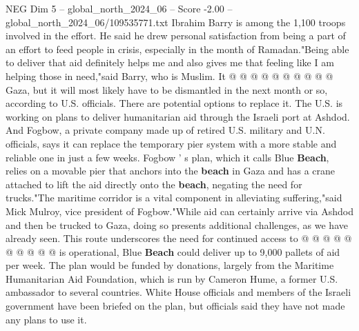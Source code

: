 \begin{textsample}{NEG Dim 5 – global\_north\_2024\_06 – Score -2.00 – global\_north\_2024\_06/109535771.txt}
Ibrahim Barry is among the 1,100 troops involved in the effort.
He said he drew personal satisfaction from being a part of an effort to feed people in crisis, especially in the month of Ramadan."Being able to deliver that aid definitely helps me and also gives me that feeling like I am helping those in need,"said Barry, who is Muslim.
It @ @ @ @ @ @ @ @ @ @ Gaza, but it will most likely have to be dismantled in the next month or so, according to U.S. officials.
There are potential options to replace it.
The U.S. is working on plans to deliver humanitarian aid through the Israeli port at Ashdod.
And Fogbow, a private company made up of retired U.S. military and U.N. officials, says it can replace the temporary pier system with a more stable and reliable one in just a few weeks.
Fogbow ' s plan, which it calls Blue \textbf{Beach}, relies on a movable pier that anchors into the \textbf{beach} in Gaza and has a crane attached to lift the aid directly onto the \textbf{beach}, negating the need for trucks."The maritime corridor is a vital component in alleviating suffering,"said Mick Mulroy, vice president of Fogbow."While aid can certainly arrive via Ashdod and then be trucked to Gaza, doing so presents additional challenges, as we have already seen.
This route underscores the need for continued access to @ @ @ @ @ @ @ @ @ @ is operational, Blue \textbf{Beach} could deliver up to 9,000 pallets of aid per week.
The plan would be funded by donations, largely from the Maritime Humanitarian Aid Foundation, which is run by Cameron Hume, a former U.S. ambassador to several countries.
White House officials and members of the Israeli government have been briefed on the plan, but officials said they have not made any plans to use it.

\end{textsample}
